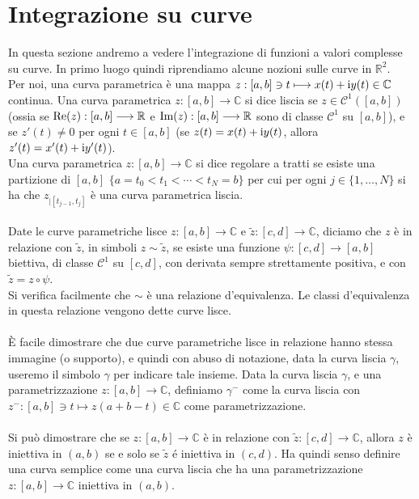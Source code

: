 \documentclass[11pt]{book}
\theoremstyle{Definizione}
\theoremstyle{TeoremaProposizioneLemmaCorollarioCongettura}
\theoremstyle{OsservazioneNotaEsempio}
\newcommand{\R}{\mathbb{R}}
\newcommand{\C}{\mathbb{C}}
\newcommand{\sub}[2]{{#1}_{|{#2}}}
\renewcommand{\Re}{\textup{Re}}
\renewcommand{\Im}{\textup{Im}}
\renewcommand{\i}{\textup{i}}
\newcommand{\Ci}[1]{\mathscr{C}^{#1}}
\begin{document}
\section{Integrazione su curve}
In questa sezione andremo a vedere l'integrazione di funzioni a valori complesse su curve. In primo luogo quindi riprendiamo alcune nozioni sulle curve in $\R^2$.\\
Per noi, una curva parametrica è una mappa $z:[a,b]\ni t \longmapsto x(t)+\i y(t)\in \C$ continua. Una curva parametrica $z:[a,b]\longrightarrow \C$ si dice liscia se $z\in \Ci{1}([a,b])$ (ossia se $\Re(z):[a,b]\longrightarrow \R$ e $\Im(z):[a,b]\longrightarrow \R$ sono di classe $\Ci{1}$ su $[a,b]$), e se $z'(t) \neq 0$ per ogni $t\in [a,b]$ (se $z(t) = x(t)+\i y(t)$, allora $z'(t) = x'(t)+\i y'(t)$).\\
Una curva parametrica $z:[a,b]\longrightarrow \C$ si dice regolare a tratti se esiste una partizione di $[a,b]$ $\{a = t_0 < t_1 < \cdots < t_N = b\}$ per cui per ogni $j\in \{1,\dots,N\}$ si ha che $\sub{z}{[t_{j-1},t_j]}$ è una curva parametrica liscia.\\
\\
Date le curve parametriche lisce $z:[a,b]\longrightarrow \C$ e $\widetilde{z}:[c,d]\longrightarrow \C$, diciamo che $z$ è in relazione con $\widetilde{z}$, in simboli $z \sim \widetilde{z}$, se esiste una funzione $\psi:[c,d]\longrightarrow [a,b]$ biettiva, di classe $\Ci{1}$ su $[c,d]$, con derivata sempre strettamente positiva, e con $\widetilde{z} = z \circ \psi$.\\
Si verifica facilmente che $\sim$ è una relazione d'equivalenza. Le classi d'equivalenza in questa relazione vengono dette curve lisce.\\
\\
È facile dimostrare che due curve parametriche lisce in relazione hanno stessa immagine (o supporto), e quindi con abuso di notazione, data la curva liscia $\gamma$, useremo il simbolo $\gamma$ per indicare tale insieme.
Data la curva liscia $\gamma$, e una parametrizzazione $z:[a,b] \longrightarrow \C$, definiamo $\gamma^-$ come la curva liscia con $z^-:[a,b]\ni t \longmapsto z(a+b-t)\in \C$ come parametrizzazione.\\
\\
Si può dimostrare che se $z:[a,b]\longrightarrow \C$ è in relazione con $\widetilde{z}:[c,d] \longrightarrow \C$, allora $z$ è iniettiva in $(a,b)$ se e solo se $\widetilde{z}$ é iniettiva in $(c,d)$. Ha quindi senso definire una curva semplice come una curva liscia che ha una parametrizzazione $z:[a,b]\longrightarrow \C$ iniettiva in $(a,b)$.\\
\end{document}
